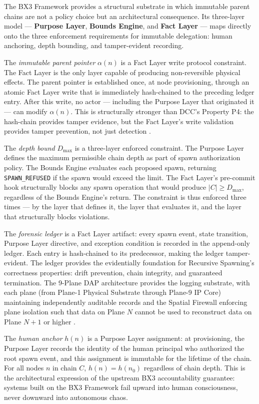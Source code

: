 The BX3 Framework provides a structural substrate in which immutable parent chains are not a policy choice but an architectural consequence. Its three-layer model — \textbf{Purpose Layer}, \textbf{Bounds Engine}, and \textbf{Fact Layer} — maps directly onto the three enforcement requirements for immutable delegation: human anchoring, depth bounding, and tamper-evident recording.

The \emph{immutable parent pointer} $\alpha(n)$ is a Fact Layer write protocol constraint. The Fact Layer is the only layer capable of producing non-reversible physical effects. The parent pointer is established once, at node provisioning, through an atomic Fact Layer write that is immediately hash-chained to the preceding ledger entry. After this write, no actor — including the Purpose Layer that originated it — can modify $\alpha(n)$. This is structurally stronger than DCC's Property P4: the hash-chain provides tamper evidence, but the Fact Layer's write validation provides tamper prevention, not just detection \cite{sentinel_agent_2026, bx3framework2026}.

The \emph{depth bound} $D_{\max}$ is a three-layer enforced constraint. The Purpose Layer defines the maximum permissible chain depth as part of spawn authorization policy. The Bounds Engine evaluates each proposed spawn, returning \texttt{SPAWN\_REFUSED} if the spawn would exceed the limit. The Fact Layer's pre-commit hook structurally blocks any spawn operation that would produce $|C| \geq D_{\max}$, regardless of the Bounds Engine's return. The constraint is thus enforced three times — by the layer that defines it, the layer that evaluates it, and the layer that structurally blocks violations.

The \emph{forensic ledger} is a Fact Layer artifact: every spawn event, state transition, Purpose Layer directive, and exception condition is recorded in the append-only ledger. Each entry is hash-chained to its predecessor, making the ledger tamper-evident. The ledger provides the evidentially foundation for Recursive Spawning's correctness properties: drift prevention, chain integrity, and guaranteed termination. The 9-Plane DAP architecture provides the logging substrate, with each plane (from Plane-1 Physical Substrate through Plane-9 IP Core) maintaining independently auditable records and the Spatial Firewall enforcing plane isolation such that data on Plane $N$ cannot be used to reconstruct data on Plane $N+1$ or higher \cite{bx3_universal_arch_2026}.

The \emph{human anchor} $h(n)$ is a Purpose Layer assignment: at provisioning, the Purpose Layer records the identity of the human principal who authorized the root spawn event, and this assignment is immutable for the lifetime of the chain. For all nodes $n$ in chain $C$, $h(n) = h(n_0)$ regardless of chain depth. This is the architectural expression of the upstream BX3 accountability guarantee: systems built on the BX3 Framework fail upward into human consciousness, never downward into autonomous chaos.

